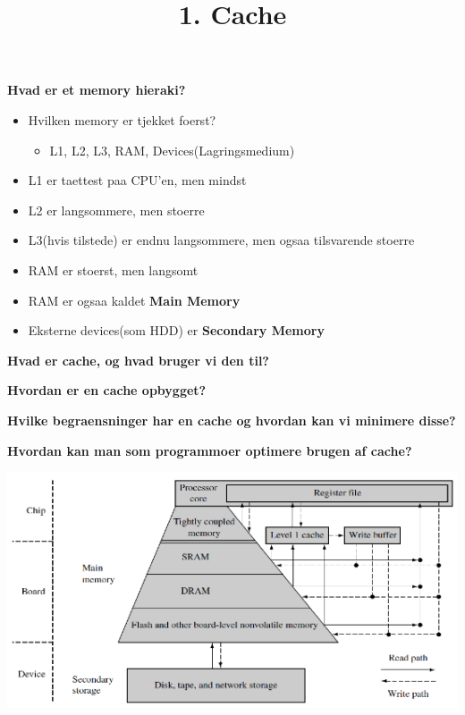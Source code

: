 \documentclass{paper}
\title{1. Cache}
\begin{document}
\maketitle
\begin{large}\textbf{Hvad er et memory hieraki?} \end{large}
\begin{itemize}

	\item Hvilken memory er tjekket foerst?
	\begin{itemize}
		\item L1, L2, L3, RAM, Devices(Lagringsmedium)
	\end{itemize}
	\item L1 er taettest paa CPU'en, men mindst
	\item L2 er langsommere, men stoerre
	\item L3(hvis tilstede) er endnu langsommere, men ogsaa tilsvarende stoerre
	\item RAM er stoerst, men langsomt
	\item RAM er ogsaa kaldet \textbf{Main Memory}
	\item Eksterne devices(som HDD) er \textbf{Secondary Memory}

\end{itemize}

\begin{large}\textbf{Hvad er cache, og hvad bruger vi den til?} \end{large}

\begin{large}\textbf{Hvordan er en cache opbygget?} \end{large}

\begin{large}\textbf{Hvilke begraensninger har en cache og hvordan kan vi minimere disse?} \end{large}

\begin{large}\textbf{Hvordan kan man som programmoer optimere brugen af cache?} \end{large}

\includegraphics[scale=0.7]{cache.png}
\end{document}
